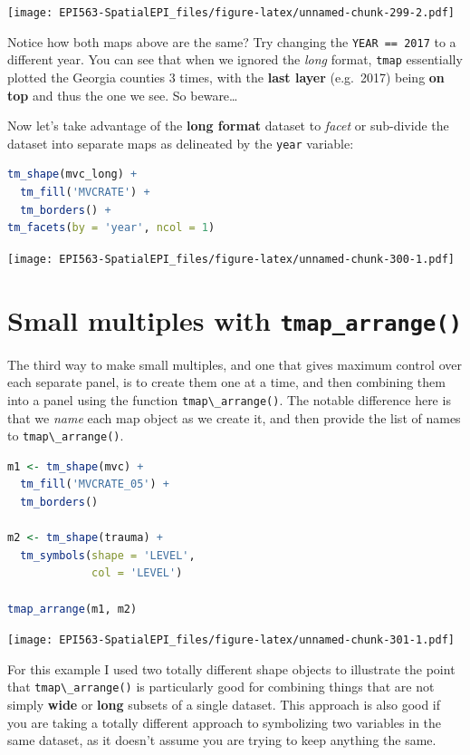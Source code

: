 \documentclass[
]{book}
\newcommand{\passthrough}[1]{#1}
\begin{document}
\texttt{[image: EPI563-SpatialEPI\_files/figure-latex/unnamed-chunk-299-2.pdf]}

Notice how both maps above are the same? Try changing the \passthrough{\lstinline!YEAR == 2017!} to a different year. You can see that when we ignored the \emph{long} format, \passthrough{\lstinline!tmap!} essentially plotted the Georgia counties 3 times, with the \textbf{last layer} (e.g.~2017) being \textbf{on top} and thus the one we see. So beware\ldots{}

Now let's take advantage of the \textbf{long format} dataset to \emph{facet} or sub-divide the dataset into separate maps as delineated by the \passthrough{\lstinline!year!} variable:

\begin{lstlisting}[language=R]
tm_shape(mvc_long) +
  tm_fill('MVCRATE') + 
  tm_borders() +
tm_facets(by = 'year', ncol = 1)
\end{lstlisting}

\texttt{[image: EPI563-SpatialEPI\_files/figure-latex/unnamed-chunk-300-1.pdf]}

\hypertarget{small-multiples-with-tmap_arrange}{%
\section{\texorpdfstring{Small multiples with \texttt{tmap\_arrange()}}{Small multiples with tmap\_arrange()}}\label{small-multiples-with-tmap_arrange}}

The third way to make small multiples, and one that gives maximum control over each separate panel, is to create them one at a time, and then combining them into a panel using the function \passthrough{\lstinline!tmap\_arrange()!}. The notable difference here is that we \emph{name} each map object as we create it, and then provide the list of names to \passthrough{\lstinline!tmap\_arrange()!}.

\begin{lstlisting}[language=R]
m1 <- tm_shape(mvc) +
  tm_fill('MVCRATE_05') +
  tm_borders()

m2 <- tm_shape(trauma) +
  tm_symbols(shape = 'LEVEL',
             col = 'LEVEL')

tmap_arrange(m1, m2)
\end{lstlisting}

\texttt{[image: EPI563-SpatialEPI\_files/figure-latex/unnamed-chunk-301-1.pdf]}

For this example I used two totally different shape objects to illustrate the point that \passthrough{\lstinline!tmap\_arrange()!} is particularly good for combining things that are not simply \textbf{wide} or \textbf{long} subsets of a single dataset. This approach is also good if you are taking a totally different approach to symbolizing two variables in the same dataset, as it doesn't assume you are trying to keep anything the same.
\end{document}
